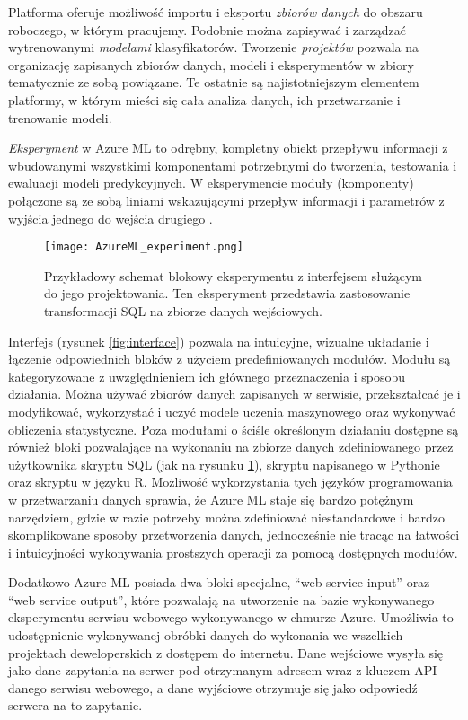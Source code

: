 Platforma oferuje możliwość importu i eksportu \emph{zbiorów danych} do obszaru roboczego, w którym pracujemy.
Podobnie można zapisywać i zarządzać wytrenowanymi \emph{modelami} klasyfikatorów.
Tworzenie \emph{projektów} pozwala na organizację zapisanych zbiorów danych, modeli i eksperymentów w zbiory tematycznie ze sobą powiązane.
Te ostatnie są najistotniejszym elementem platformy, w którym mieści się cała analiza danych, ich przetwarzanie i trenowanie modeli.

\emph{Eksperyment} w Azure ML to odrębny, kompletny obiekt przepływu informacji z wbudowanymi wszystkimi komponentami potrzebnymi do tworzenia, testowania i ewaluacji modeli predykcyjnych.
W eksperymencie moduły (komponenty) połączone są ze sobą liniami wskazującymi przepływ informacji i parametrów z wyjścia jednego do wejścia drugiego \cite{barga2015introducing}.

\begin{figure}[ht]
	\texttt{[image: AzureML\_experiment.png]}
	\caption{Przykładowy schemat blokowy eksperymentu z interfejsem służącym do jego projektowania. Ten eksperyment przedstawia zastosowanie transformacji SQL na zbiorze danych wejściowych.}
	\label{fig:experiment}
\end{figure}

Interfejs (rysunek \ref{fig:interface}) pozwala na intuicyjne, wizualne układanie i łączenie odpowiednich bloków z użyciem predefiniowanych modułów.
Modułu są kategoryzowane z uwzględnieniem ich głównego przeznaczenia i sposobu działania.
Można używać zbiorów danych zapisanych w serwisie, przekształcać je i modyfikować, wykorzystać i uczyć modele uczenia maszynowego oraz wykonywać obliczenia statystyczne.
Poza modułami o ściśle określonym działaniu dostępne są również bloki pozwalające na wykonaniu na zbiorze danych zdefiniowanego przez użytkownika skryptu SQL (jak na rysunku \ref{fig:experiment}), skryptu napisanego w Pythonie oraz skryptu w języku R.
Możliwość wykorzystania tych języków programowania w przetwarzaniu danych sprawia, że Azure ML staje się bardzo potężnym narzędziem, gdzie w razie potrzeby można zdefiniować niestandardowe i bardzo skomplikowane sposoby przetworzenia danych, jednocześnie nie tracąc na łatwości i intuicyjności wykonywania prostszych operacji za pomocą dostępnych modułów.

Dodatkowo Azure ML posiada dwa bloki specjalne, ``web service input'' oraz ``web service output'', które pozwalają na utworzenie na bazie wykonywanego eksperymentu serwisu webowego wykonywanego w chmurze Azure.
Umożliwia to udostępnienie wykonywanej obróbki danych do wykonania we wszelkich projektach deweloperskich z dostępem do internetu.
Dane wejściowe wysyła się jako dane zapytania na serwer pod otrzymanym adresem wraz z kluczem API danego serwisu webowego, a dane wyjściowe otrzymuje się jako odpowiedź serwera na to zapytanie.
